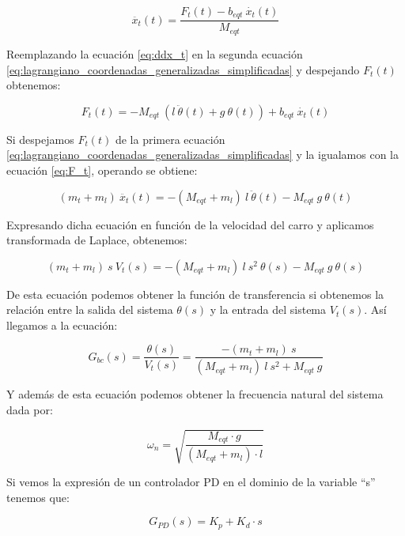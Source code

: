 \documentclass[11pt]{article}
\begin{document}
\begin{equation}
	\label{eq:ddx_t}
	\ddot{x_t}(t)=\frac{F_t(t)-b_{eqt}\ \dot{x_t}(t)}{M_{eqt}}
\end{equation}

Reemplazando la ecuación \ref{eq:ddx_t} en la segunda ecuación \ref{eq:lagrangiano_coordenadas_generalizadas_simplificadas} y despejando $F_{t}(t)$ obtenemos:

\begin{equation}
	\label{eq:F_t}
	F_{t}(t)=-M_{eqt}\ \left ( l\ \ddot{\theta}(t)+g\ \theta(t) \right )+b_{eqt}\ \dot{x_t}(t)
\end{equation}

Si despejamos $F_{t}(t)$ de la primera ecuación \ref{eq:lagrangiano_coordenadas_generalizadas_simplificadas} y la igualamos con la ecuación \ref{eq:F_t}, operando se obtiene:

\begin{equation}
	\label{eq:F_t_2}
	(m_t+m_l)\ \ddot{x_t}(t)=-(M_{eqt}+m_l)\ l\ \ddot{\theta}(t)-M_{eqt}\ g\ \theta(t)
\end{equation}

Expresando dicha ecuación en función de la velocidad del carro y aplicamos transformada de Laplace, obtenemos:

\begin{equation}
	\label{eq:laplace_F_t_2}
	(m_t+m_l)\ s\ V_t(s)=-(M_{eqt}+m_l)\ l\ s^{2}\ \theta(s)-M_{eqt}\ g\ \theta(s)
\end{equation}

De esta ecuación podemos obtener la función de transferencia si obtenemos la relación entre la salida del sistema $\theta(s)$ y la entrada del sistema $V_t(s)$. Así llegamos a la ecuación:

\begin{equation}
	\label{eq:funcion_transferencia}
	G_{bc}(s)=\frac{\theta(s)}{V_t(s)}=\frac{-(m_t+m_l)\ s}{(M_{eqt}+m_l)\ l\ s^{2}+ M_{eqt}\ g}
\end{equation}

Y además de esta ecuación podemos obtener la frecuencia natural del sistema dada por:

\begin{equation}
	\label{eq:frecuencia_natural}
	\omega_{n}=\sqrt{\frac{M_{eqt}\cdot g}{(M_{eqt}+m_l)\cdot l}}
\end{equation}

Si vemos la expresión de un controlador PD en el dominio de la variable ``s'' tenemos que:

\begin{equation}
	\label{eq:controlador_PD}
	G_{PD}(s)=K_p+K_d\cdot s
\end{equation}
\end{document}
